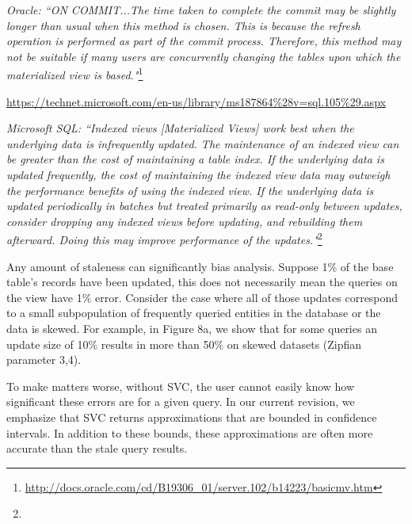 \vspace{0.5em}

\emph{Oracle: ``ON COMMIT...The time taken to complete the commit may be slightly longer than usual when this method is chosen. This is because the refresh operation is performed as part of the commit process. Therefore, this method may not be suitable if many users are concurrently changing the tables upon which the materialized view is based."}\footnote{\url{http://docs.oracle.com/cd/B19306_01/server.102/b14223/basicmv.htm}}


\vspace{0.5em}

\urldef{\microsoft}\url{https://technet.microsoft.com/en-us/library/ms187864%28v=sql.105%29.aspx}

\emph{Microsoft SQL: ``Indexed views [Materialized Views] work best when the underlying data is infrequently updated. The maintenance of an indexed view can be greater than the cost of maintaining a table index. If the underlying data is updated frequently, the cost of maintaining the indexed view data may outweigh the performance benefits of using the indexed view. If the underlying data is updated periodically in batches but treated primarily as read-only between updates, consider dropping any indexed views before updating, and rebuilding them afterward. Doing this may improve performance of the updates."}\footnote{\microsoft}

\vspace{0.5em}

Any amount of staleness can significantly bias analysis. Suppose 1\% of the base table's records have been updated, this does not necessarily mean the queries on the view have 1\% error.  Consider the case where all of those updates correspond to a small subpopulation of frequently queried entities in the database or the data is skewed. For example, in Figure 8a, we show that for some queries an update size of 10\% results in more than 50\% on  skewed datasets (Zipfian parameter 3,4).

To make matters worse, without SVC, the user cannot easily know how significant these errors are for a given query. 
In our current revision, we emphasize that SVC returns approximations that are bounded in confidence intervals.
In addition to these bounds, these approximations are often more accurate than the stale query results.

